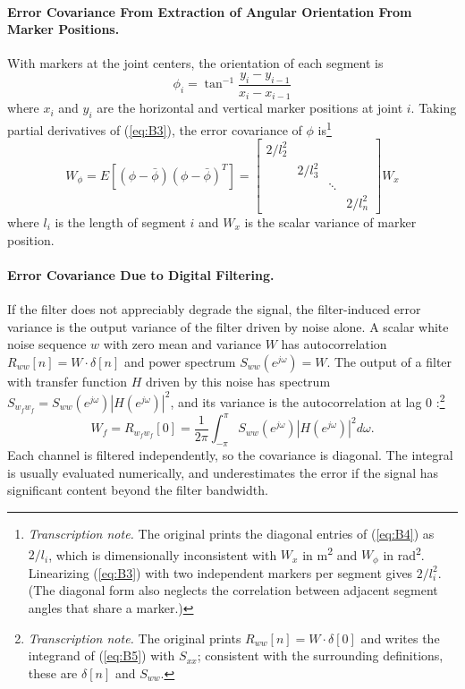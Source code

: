 \documentclass[11pt]{article}
\newcommand{\tnote}[1]{\footnote{\textit{Transcription note.} #1}}
\begin{document}
\paragraph{Error Covariance From Extraction of Angular Orientation From
Marker Positions.} With markers at the joint centers, the orientation of each
segment is
\begin{equation}
\phi_i = \tan^{-1}\frac{y_i - y_{i-1}}{x_i - x_{i-1}}
\label{eq:B3}
\end{equation}
where $x_i$ and $y_i$ are the horizontal and vertical marker positions at
joint $i$. Taking partial derivatives of (\ref{eq:B3}), the error covariance
of $\phi$ is\tnote{The original prints the diagonal entries of (\ref{eq:B4})
as $2/l_i$, which is dimensionally inconsistent with $W_x$ in
\si{\metre\squared} and $W_{\phi}$ in \si{\radian\squared}. Linearizing
(\ref{eq:B3}) with two independent markers per segment gives $2/l_i^2$. (The
diagonal form also neglects the correlation between adjacent segment angles
that share a marker.)}
\begin{equation}
W_{\phi} = E[(\phi-\bar{\phi})(\phi-\bar{\phi})^T]
= \begin{bmatrix}
2/l_2^2 & & & \\
& 2/l_3^2 & & \\
& & \ddots & \\
& & & 2/l_n^2
\end{bmatrix} W_x
\label{eq:B4}
\end{equation}
where $l_i$ is the length of segment $i$ and $W_x$ is the scalar variance of
marker position.

\paragraph{Error Covariance Due to Digital Filtering.} If the filter does
not appreciably degrade the signal, the filter-induced error variance is the
output variance of the filter driven by noise alone. A scalar white noise
sequence $w$ with zero mean and variance $W$ has autocorrelation
$R_{ww}[n]=W\cdot\delta[n]$ and power spectrum $S_{ww}(e^{j\omega})=W$. The
output of a filter with transfer function $H$ driven by this noise has
spectrum $S_{w_fw_f}=S_{ww}(e^{j\omega})|H(e^{j\omega})|^2$, and its variance
is the autocorrelation at lag 0 \cite{StarkWoods1986}:\tnote{The original
prints $R_{ww}[n]=W\cdot\delta[0]$ and writes the integrand of (\ref{eq:B5})
with $S_{xx}$; consistent with the surrounding definitions, these are
$\delta[n]$ and $S_{ww}$.}
\begin{equation}
W_f = R_{w_fw_f}[0] = \frac{1}{2\pi}\int_{-\pi}^{\pi}
S_{ww}(e^{j\omega})|H(e^{j\omega})|^2d\omega.
\label{eq:B5}
\end{equation}
Each channel is filtered independently, so the covariance is diagonal. The
integral is usually evaluated numerically, and underestimates the error if
the signal has significant content beyond the filter bandwidth.
\end{document}
